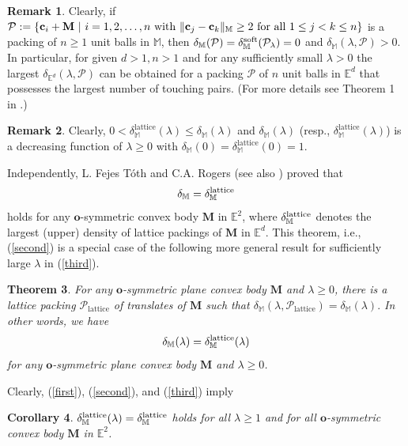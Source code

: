 \documentclass[11pt]{amsart}
\newcommand{\Eu}{\mathbb{E}}
\newcommand{\M}{\mathbb{M}}
\newcommand{\MM}{\mathbf{M}}
\renewcommand{\P}{\mathcal{P}}
\renewcommand{\o}{\mathbf{o}}
\renewcommand{\c}{\mathbf{c}}
\newtheorem{theorem}{Theorem}[section]
\newtheorem{corollary}[theorem]{Corollary}
\theoremstyle{definition}
\newtheorem{remark}[theorem]{Remark}
\numberwithin{equation}{section}
\begin{document}
\begin{remark} Clearly, if $\P:=\{\c_i+\MM\ |\ i=1,2,\dots,n \ {\rm with}\ \|\c_j-\c_k\|_{\M} \ge 2\ {\rm for}\ {\rm all}\ 1\leq j<k\leq n\}$ is a packing of $n\geq 1$ unit balls in $\M$, then $\delta_{\M}(\P)=\delta^{{\rm soft}}_{\M}(\P_{\lambda})=0$ and $ {\delta}_{\M}(\lambda , \P)>0$. In particular, for given $d>1, n>1$ and for any sufficiently small $\lambda>0$ the largest ${\delta}_{\Eu^d}(\lambda , \P)$ can be obtained for a packing $\P$ of $n$ unit balls in $\Eu^d$ that possesses the largest number of touching pairs. (For more details see Theorem 1 in  \cite{Be-La-2015}.)
\end{remark}

 \begin{remark} Clearly, $0<{\delta}_{\M}^{\mathrm{lattice}}(\lambda)\leq {\delta}_{\M}(\lambda)$ and ${\delta}_{\M}(\lambda)$ (resp., ${\delta}_{\M}^{\mathrm{lattice}}(\lambda)$) is a decreasing function of $\lambda\geq 0$ with ${\delta}_{\M}(0)={\delta}_{\M}^{\mathrm{lattice}}(0)=1$.
\end{remark} 

Independently, L. Fejes T\'oth \cite{LFT50} and C.A. Rogers \cite{Rogers} (see also \cite{Rogers2}) proved that 
\begin{equation}\label{second}
{\delta}_{\M}={\delta}^{\rm lattice}_{\M}
\end{equation} 
holds for any $\o$-symmetric convex body $\MM$ in $\Eu^2$, where ${\delta}^{\rm lattice}_{\M}$ denotes the largest (upper) density of lattice packings of $\MM$ in $\Eu^d$. This theorem, i.e., (\ref{second}) is a special case of the following more general result for sufficiently large $\lambda$ in (\ref{third}).
\begin{theorem}\label{thm:lattice}
For any $\o$-symmetric plane convex body $\MM$ and $\lambda\geq 0$, there is a lattice packing $\P_{\mathrm{lattice}}$ of translates of $\MM$ such that
$
\delta_{\M}(\lambda, \P_{\mathrm{lattice}}) = \delta_{\M}(\lambda).
$
In other words, we have
\begin{equation}\label{third}
\delta_{\M}(\lambda) = \delta_{\M}^{\rm lattice}(\lambda)
\end{equation}
for any $\o$-symmetric plane convex body $\MM$ and $\lambda\geq 0$.
\end{theorem}

Clearly, (\ref{first}), (\ref{second}), and (\ref{third}) imply 

\begin{corollary}\label{2D-lattice}
 ${\delta}_{\M}^{\mathrm{lattice}}(\lambda)={\delta}^{\rm lattice}_{\M}$ holds for all $\lambda\geq 1$ and for all $\o$-symmetric convex body $\MM$ in $\Eu^2$.
 \end{corollary}
 
\end{document}
